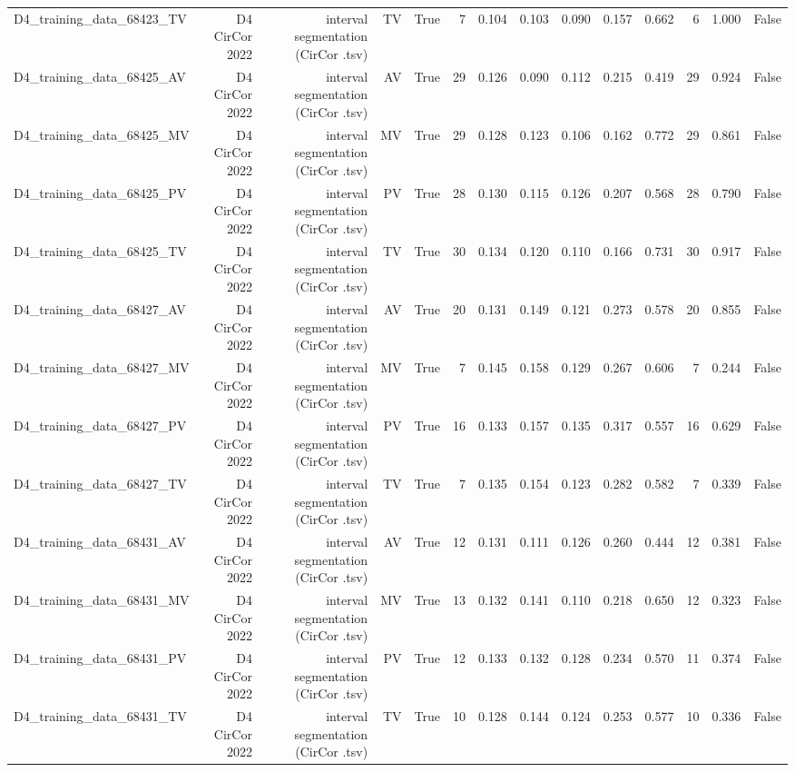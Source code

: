 \begin{table}[htbp]
\begin{tabular}{lrrrrrrrrrrrrr}
    D4\_training\_data\_68423\_TV & D4 CirCor 2022 & interval segmentation (CirCor .tsv) & TV & True & 7 & 0.104 & 0.103 & 0.090 & 0.157 & 0.662 & 6 & 1.000 & False \\
    D4\_training\_data\_68425\_AV & D4 CirCor 2022 & interval segmentation (CirCor .tsv) & AV & True & 29 & 0.126 & 0.090 & 0.112 & 0.215 & 0.419 & 29 & 0.924 & False \\
    D4\_training\_data\_68425\_MV & D4 CirCor 2022 & interval segmentation (CirCor .tsv) & MV & True & 29 & 0.128 & 0.123 & 0.106 & 0.162 & 0.772 & 29 & 0.861 & False \\
    D4\_training\_data\_68425\_PV & D4 CirCor 2022 & interval segmentation (CirCor .tsv) & PV & True & 28 & 0.130 & 0.115 & 0.126 & 0.207 & 0.568 & 28 & 0.790 & False \\
    D4\_training\_data\_68425\_TV & D4 CirCor 2022 & interval segmentation (CirCor .tsv) & TV & True & 30 & 0.134 & 0.120 & 0.110 & 0.166 & 0.731 & 30 & 0.917 & False \\
    D4\_training\_data\_68427\_AV & D4 CirCor 2022 & interval segmentation (CirCor .tsv) & AV & True & 20 & 0.131 & 0.149 & 0.121 & 0.273 & 0.578 & 20 & 0.855 & False \\
    D4\_training\_data\_68427\_MV & D4 CirCor 2022 & interval segmentation (CirCor .tsv) & MV & True & 7 & 0.145 & 0.158 & 0.129 & 0.267 & 0.606 & 7 & 0.244 & False \\
    D4\_training\_data\_68427\_PV & D4 CirCor 2022 & interval segmentation (CirCor .tsv) & PV & True & 16 & 0.133 & 0.157 & 0.135 & 0.317 & 0.557 & 16 & 0.629 & False \\
    D4\_training\_data\_68427\_TV & D4 CirCor 2022 & interval segmentation (CirCor .tsv) & TV & True & 7 & 0.135 & 0.154 & 0.123 & 0.282 & 0.582 & 7 & 0.339 & False \\
    D4\_training\_data\_68431\_AV & D4 CirCor 2022 & interval segmentation (CirCor .tsv) & AV & True & 12 & 0.131 & 0.111 & 0.126 & 0.260 & 0.444 & 12 & 0.381 & False \\
    D4\_training\_data\_68431\_MV & D4 CirCor 2022 & interval segmentation (CirCor .tsv) & MV & True & 13 & 0.132 & 0.141 & 0.110 & 0.218 & 0.650 & 12 & 0.323 & False \\
    D4\_training\_data\_68431\_PV & D4 CirCor 2022 & interval segmentation (CirCor .tsv) & PV & True & 12 & 0.133 & 0.132 & 0.128 & 0.234 & 0.570 & 11 & 0.374 & False \\
    D4\_training\_data\_68431\_TV & D4 CirCor 2022 & interval segmentation (CirCor .tsv) & TV & True & 10 & 0.128 & 0.144 & 0.124 & 0.253 & 0.577 & 10 & 0.336 & False \\

\end{tabular}
\end{table}
